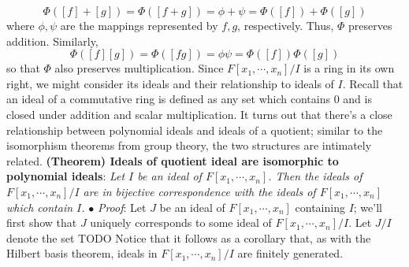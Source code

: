 \documentclass{article}
\newcommand*{\tb}{\textbf}
\newcommand*{\ti}{\textit}
\newcommand*{\n}{\newline}
\newcommand*{\nn}{\newline \newline}
\newcommand*{\Pf}{\indent \ensuremath{\bullet} \textit{Proof}: }
\newcommand*{\Fx}{\ensuremath{F[x_1, \cdots, x_n]}}
\begin{document}
$$ \Phi([ f ] + [ g ]) = \Phi([ f + g ]) = \phi + \psi = \Phi([ f ]) + \Phi([ g ]) $$
where $ \phi, \psi $ are the mappings represented by $ f, g $, respectively. Thus, $ \Phi $ preserves addition. Similarly,
$$ \Phi([ f ] [ g ]) = \Phi([ f g ]) = \phi \psi = \Phi([ f ]) \Phi([ g ]) $$
so that $ \Phi $ also preserves multiplication. \qedsymbol
\nn
Since $ \Fx / I $ is a ring in its own right, we might consider its ideals and their relationship to ideals of $ I $. Recall that an ideal of a commutative ring is defined as any set which contains $ 0 $ and is closed under addition and scalar multiplication. It turns out that there's a close relationship between polynomial ideals and ideals of a quotient; similar to the isomorphism theorems from group theory, the two structures are intimately related.
\nn
\tb{(Theorem) Ideals of quotient ideal are isomorphic to polynomial ideals}: \ti{Let $ I $ be an ideal of $ \Fx $. Then the ideals of $ \Fx / I $ are in bijective correspondence with the ideals of $ \Fx $ which contain $ I $.}
\n
\Pf Let $ J $ be an ideal of $ \Fx $ containing $ I $; we'll first show that $ J $ uniquely corresponds to some ideal of $ \Fx / I $. Let $ J / I $ denote the set TODO
\nn
Notice that it follows as a corollary that, as with the Hilbert basis theorem, ideals in $ \Fx / I $ are finitely generated.
\end{document}
